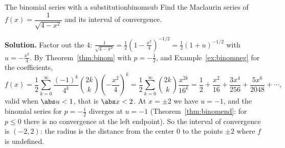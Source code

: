 \documentclass[11pt]{article}
\begin{document}
\begin{exmp}{The binomial series with a substitution}{binomsub}
Find the Maclaurin series of $f(x)=\dfrac1{\sqrt{4-x^2}}$ and its interval of convergence.

\textbf{Solution.} Factor out the $4$: $\frac1{\sqrt{4-x^2}}=\frac12\left(1-\frac{x^2}4\right)^{-1/2}=\frac12(1+u)^{-1/2}$ with $u=-\frac{x^2}4$. By Theorem~\ref{thm:binom} with $p=-\frac12$, and Example~\ref{ex:binomneg} for the coefficients,
\[
f(x)=\frac12\sum_{k=0}^\infty\frac{(-1)^k}{4^k}\binom{2k}k\left(-\frac{x^2}4\right)^k=\frac12\sum_{k=0}^\infty\binom{2k}k\frac{x^{2k}}{16^k}=\frac12+\frac{x^2}{16}+\frac{3x^4}{256}+\frac{5x^6}{2048}+\cdots,
\]
valid when $\abs u<1$, that is $\abs x<2$. At $x=\pm2$ we have $u=-1$, and the binomial series for $p=-\frac12$ diverges at $u=-1$ (Theorem~\ref{thm:binomend}: for $p\le0$ there is no convergence at the left endpoint). So the interval of convergence is $(-2,2)$: the radius is the distance from the center $0$ to the points $\pm2$ where $f$ is undefined.
\end{exmp}
\end{document}
